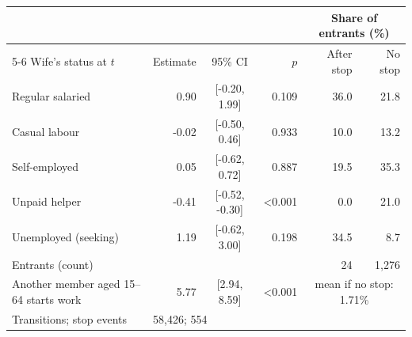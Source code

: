 \begin{tabular}{lrcrrr}
\toprule
 & & & & \multicolumn{2}{c}{Share of entrants (\%)} \\
\cmidrule(lr){5-6}
Wife's status at $t$ & Estimate & 95\% CI & $p$ & After stop & No stop \\
\midrule
Regular salaried & 0.90 & [-0.20, 1.99] & 0.109 & 36.0 & 21.8 \\
Casual labour & -0.02 & [-0.50, 0.46] & 0.933 & 10.0 & 13.2 \\
Self-employed & 0.05 & [-0.62, 0.72] & 0.887 & 19.5 & 35.3 \\
Unpaid helper & -0.41 & [-0.52, -0.30] & <0.001 & 0.0 & 21.0 \\
Unemployed (seeking) & 1.19 & [-0.62, 3.00] & 0.198 & 34.5 & 8.7 \\
Entrants (count) & & & & 24 & 1,276 \\
\midrule
Another member aged 15--64 starts work & 5.77 & [2.94, 8.59] & <0.001 & \multicolumn{2}{c}{mean if no stop: 1.71\%} \\
\quad Transitions; stop events & \multicolumn{3}{l}{58,426; 554} & & \\
\bottomrule
\end{tabular}
